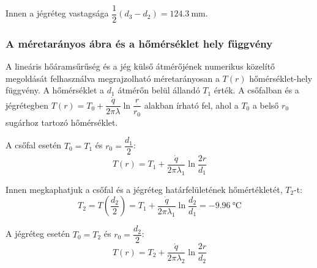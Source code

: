 Innen a jégréteg vastagsága $\dfrac{1}{2}\left(d_3 - d_2\right) = \SI{124.3}{\milli\meter}$.

\subsubsection*{A méretarányos ábra és a hőmérséklet hely függvény}
A lineáris hőáramsűrűség és a jég külső átmérőjének numerikus közelítő megoldását felhasználva megrajzolható méretarányosan a $T\!\left(r\right)$ hőmérséklet-hely függvény. A hőmérséklet a $d_1$ átmérőn belül állandó $T_1$ érték. A csőfalban és a jégrétegben $T\!\left(r\right) = T_0 + \dfrac{\dot{q}}{2 \pi \lambda} \ln\dfrac{r}{r_0}$ alakban írható fel, ahol a $T_0$ a belső $r_0$ sugárhoz tartozó hőmérséklet.

A csőfal esetén $T_0 = T_1$ és $r_0 = \dfrac{d_1}{2}$:
\begin{equation}
	T\!\left(r\right) = T_1 + \dfrac{\dot{q}}{2 \pi \lambda_1} \ln\dfrac{2 r}{d_1}
\end{equation}

Innen megkaphatjuk a csőfal és a jégréteg határfelületének hőmértékletét, $T_2$-t:
\begin{equation}
	T_2 = T\!\left(\frac{d_2}{2}\right) = T_1 + \dfrac{\dot{q}}{2 \pi \lambda_1} \ln\dfrac{d_2}{d_1} = \SI{-9.96}{\celsius}
\end{equation}

A jégréteg esetén $T_0 = T_2$ és $r_0 = \dfrac{d_2}{2}$:
\begin{equation}
	T\!\left(r\right) = T_2 + \dfrac{\dot{q}}{2 \pi \lambda_2} \ln\dfrac{2 r}{d_2}
\end{equation}


